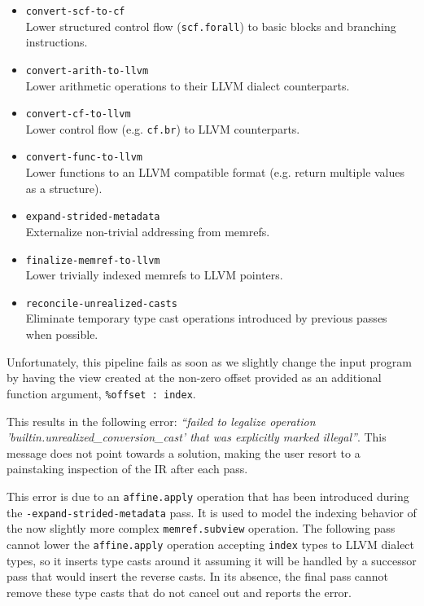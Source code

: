 \documentclass[screen,nonacm,authorversion]{acmart}
\newcommand{\margincomment}[1]{#1}
\newcommand{\margincomment}[1]{}
\newcommand{\az}[1]{\margincomment{\marginpar{\color{brown}\small\textbf{Alex:} #1}}}
\begin{document}
\begin{itemize}
    \item[\Circled{1}] \texttt{convert-scf-to-cf}\\
    Lower structured control flow (\texttt{scf.forall}) to basic blocks and branching instructions.
    \item[\Circled{2}] \texttt{convert-arith-to-llvm}\\
    Lower arithmetic operations to their LLVM dialect counterparts.
    \item[\Circled{3}] \texttt{convert-cf-to-llvm}\\
    Lower control flow (e.g. \texttt{cf.br}) to LLVM counterparts.
    \item[\Circled{4}] \texttt{convert-func-to-llvm}\\
    Lower functions to an LLVM compatible format (e.g. return multiple values as a structure).
    \item[\Circled{5}] \texttt{expand-strided-metadata}\\
    Externalize non-trivial addressing from memrefs.
    \item[\Circled{6}] \texttt{finalize-memref-to-llvm}\\
    Lower trivially indexed memrefs to LLVM pointers.
    \item[\Circled{7}] \texttt{reconcile-unrealized-casts}\\
    Eliminate temporary type cast operations introduced by previous passes when possible.
\end{itemize}



Unfortunately, this pipeline fails as soon as we slightly change the input program by
having the view created at the non-zero offset provided as an additional function argument, \texttt{\%offset\,:\,index}.






This results in the following error: \emph{``failed to legalize operation 'builtin.unrealized\_conversion\_cast' that was explicitly marked illegal''}. 
This message does not point towards a solution, making the user resort to a painstaking inspection of the IR after each pass.

This error is due to an \texttt{affine.apply} operation that has been introduced during the \texttt{-expand-strided-metadata} pass. It is used to model the indexing behavior of the now slightly more complex \texttt{memref.subview} operation. The following pass  cannot lower the \texttt{affine.apply} operation accepting \texttt{index} types to LLVM dialect types, so it inserts type casts around it assuming it will be handled by a successor pass that would insert the reverse casts. In its absence, the final pass  cannot remove these type casts that do not cancel out and reports the error.
\end{document}

